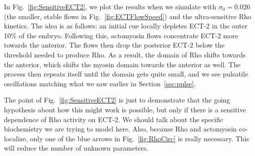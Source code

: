 \documentclass[11pt]{article}
\begin{document}
In Fig.\ \ref{fig:SensitiveECT2}, we plot the results when we simulate with $\sigma_0=0.026$ (the smaller, stable flows in Fig.\ \ref{fig:ECTFlowSpeed}) and the ultra-sensitive Rho kinetics. The idea is as follows: an initial cue locally depletes ECT-2 in the outer 10\% of the embryo. Following this, actomyosin flows concentrate ECT-2 more towards the anterior. The flows then drop the posterior ECT-2 below the threshold needed to produce Rho. As a result, the domain of Rho shifts towards the anterior, which shifts the myosin domain towards the anterior as well. The process then repeats itself until the domain gets quite small, and we see pulsatile oscillations matching what we saw earlier in Section\ \ref{sec:pulse}. 

The point of Fig.\ \ref{fig:SensitiveECT2} is just to demonstrate that the going hypothesis about how this might work is possible, but only if there is a sensitive dependence of Rho activity on ECT-2. We should talk about the specific biochemistry we are trying to model here. Also, because Rho and actomyosin co-localize, only one of the blue arrows in Fig.\ \ref{fig:RhoCirc} is really necessary. This will reduce the number of unknown parameters.
\fi




\end{document}
